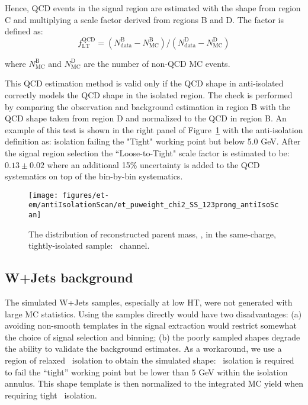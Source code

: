 Hence, QCD events in the signal region are estimated with the shape from region C 
and multiplying a scale factor derived from regions B and D. The factor is defined as:
\begin{equation}\label{eq:et_qcd_sf}
f_\mathrm{LT}^\mathrm{QCD} = \left(N_\mathrm{data}^\mathrm{B} - N_\mathrm{MC}^\mathrm{B}\right)
/ \left(N_\mathrm{data}^\mathrm{D} -
N_\mathrm{MC}^\mathrm{D}\right)
\end{equation}

\noindent where $N_\mathrm{MC}^\mathrm{B}$ and $N_\mathrm{MC}^\mathrm{D}$ are the number of non-QCD MC events.

This QCD estimation method is valid only if the QCD shape in
anti-isolated correctly models the QCD shape in the isolated
region. The check is performed by comparing the observation and background
estimation in region B with the QCD shape taken from region D and
normalized to the QCD in region B.  An example of this test is shown
in the right panel of Figure~\ref{fig:et_sst} with the anti-isolation
definition as: \tauh isolation failing the "Tight" working point but
below 5.0 GeV. After the signal region selection the ``Loose-to-Tight" scale factor is estimated
to be: $0.13 \pm 0.02$ where an additional 15\% uncertainty is added to the QCD systematics 
on top of the bin-by-bin systematics.

\begin{figure}[thbp!]\centering
  \texttt{[image: figures/et-em/antiIsolationScan/et\_puweight\_chi2\_SS\_123prong\_antiIsoScan]} %
  \caption{\label{fig:et_sst} The distribution of reconstructed parent
    mass, \meffetau, in the same-charge, tightly-isolated sample:
    \teth ~channel.}
\end{figure}

\subsection{W+Jets background}
\label{sec:et_w_bkg_validation}

The simulated W+Jets samples, especially at low HT, were not
generated with large MC statistics.  Using the samples directly would
have two disadvantages: (a) avoiding non-smooth templates in the
signal extraction would restrict somewhat the choice of signal
selection and binning; (b) the poorly sampled shapes degrade the
ability to validate the background estimates.  As a workaround, we use
a region of relaxed \tauh ~isolation to obtain the simulated shape:
\tauh ~isolation is required to fail the ``tight'' working point but be
lower than $5$ GeV within the isolation annulus.  This shape template is then normalized to the
integrated MC yield when requiring tight \tauh ~isolation.

